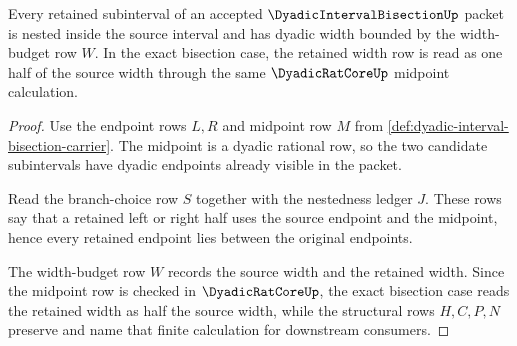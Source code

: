 \begin{theorem}
\label{thm:dyadic-interval-bisection-nested-width}
Every retained subinterval of an accepted $\DyadicIntervalBisectionUp$ packet is nested inside the source interval and has dyadic width bounded by the width-budget row $W$. In the exact bisection case, the retained width row is read as one half of the source width through the same $\DyadicRatCoreUp$ midpoint calculation.
\end{theorem}
\begin{proof}
Use the endpoint rows $L,R$ and midpoint row $M$ from \autoref{def:dyadic-interval-bisection-carrier}. The midpoint is a dyadic rational row, so the two candidate subintervals have dyadic endpoints already visible in the packet.

Read the branch-choice row $S$ together with the nestedness ledger $J$. These rows say that a retained left or right half uses the source endpoint and the midpoint, hence every retained endpoint lies between the original endpoints.

The width-budget row $W$ records the source width and the retained width. Since the midpoint row is checked in $\DyadicRatCoreUp$, the exact bisection case reads the retained width as half the source width, while the structural rows $H,C,P,N$ preserve and name that finite calculation for downstream consumers.
\end{proof}


\begin{closurestatus}{\DyadicIntervalBisectionUp}
  \theoryclosure{\seedClosure}
  \formalstatus{\unformalizedV}
\end{closurestatus}
